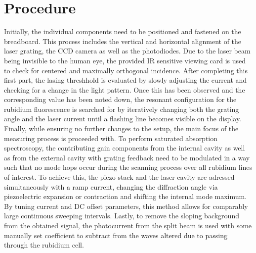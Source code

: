 \section{Procedure}
\label{sec:procedure}

Initially, the individual components need to be positioned and fastened on the breadboard. This process includes the
vertical and horizontal alignment of the laser grating, the CCD camera as well as the photodiodes.
Due to the laser beam being invisible to the human eye, the provided IR sensitive viewing card is used to check for centered
and maximally orthogonal incidence. After completing this first part, the lasing threshhold is evaluated by slowly adjusting the
current and checking for a change in the light pattern. Once this has been observed and the corresponding value has been noted down,
the resonant configuration for the rubidium fluorescence is searched for by iteratively changing both the grating angle and the
laser current until a flashing line becomes visible on the display. Finally, while ensuring no further changes to the setup, the
main focus of the measuring process is proceeded with. To perform saturated absorption spectroscopy, the contributing gain components
from the internal cavity as well as from the external cavity with grating feedback need to be modulated in a way such that
no mode hops occur during the scanning process over all rubidium lines of interest. To achieve this, the piezo stack and the laser
cavity are adressed simultaneously with a ramp current, changing the diffraction angle via piezoelectric expansion or contraction and
shifting the internal mode maximum. By tuning current and DC offset parameters, this method allows for comparably large continuous
sweeping intervals. Lastly, to remove the sloping background from the obtained signal, the photocurrent from the split beam is used
with some manually set coefficient to subtract from the waves altered due to passing through the rubidium cell.
